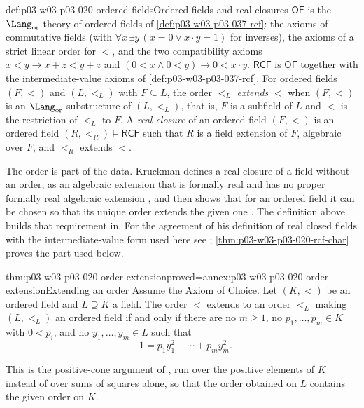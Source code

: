 \begin{hbdefinition}{def:p03-w03-p03-020-ordered-fields}{Ordered fields and real closures}
\(\mathsf{OF}\) is the \(\Lang_{\mathrm{or}}\)-theory of ordered fields of
\cref{def:p03-w03-p03-037-rcf}: the axioms of commutative fields (with
\(\forall x\,\exists y\,(x=0\lor x\mathbin{\cdot}y=1)\) for inverses), the
axioms of a strict linear order for \(<\), and the two compatibility axioms
\(x<y\rightarrow x+z<y+z\) and \((0<x\land0<y)\rightarrow0<x\mathbin{\cdot}y\).
\(\mathsf{RCF}\) is \(\mathsf{OF}\) together with the intermediate-value
axioms of \cref{def:p03-w03-p03-037-rcf}. For ordered fields \((F,<)\) and
\((L,<_L)\) with \(F\subseteq L\), the order \(<_L\) \emph{extends} \(<\)
when \((F,<)\) is an \(\Lang_{\mathrm{or}}\)-substructure of \((L,<_L)\),
that is, \(F\) is a subfield of \(L\) and \(<\) is the restriction of
\(<_L\) to \(F\). A \emph{real closure} of an ordered field \((F,<)\) is an
ordered field \((R,<_R)\models\mathsf{RCF}\) such that \(R\) is a field
extension of \(F\), algebraic over \(F\), and \(<_R\) extends \(<\).
\end{hbdefinition}

The order is part of the data. Kruckman defines a real closure of a field
without an order, as an algebraic extension that is formally real and has no
proper formally real algebraic extension \cite[Definitions~3.16 and~3.18,
p.~30]{Kruckman2020}, and then shows that for an ordered field it can be
chosen so that its unique order extends the given one
\cite[Theorem~3.28, p.~36]{Kruckman2020}. The definition above builds that
requirement in. For the agreement of his definition of real closed fields
with the intermediate-value form used here see
\cite[Theorem~3.31, p.~37]{Kruckman2020};
\cref{thm:p03-w03-p03-020-rcf-char} proves the part used below.

\begin{hblemma}{thm:p03-w03-p03-020-order-extension}{proved=annex:p03-w03-p03-020-order-extension}{Extending an order}
Assume the Axiom of Choice. Let \((K,<)\) be an ordered field and
\(L\supseteq K\) a field. The order \(<\) extends to an order \(<_L\) making
\((L,<_L)\) an ordered field if and only if there are no \(m\ge1\), no
\(p_1,\ldots,p_m\in K\) with \(0<p_i\), and no \(y_1,\ldots,y_m\in L\) such
that
\[
 -1=p_1y_1^2+\cdots+p_my_m^2 .
\]
\end{hblemma}

This is the positive-cone argument of \cite[Lemmas~3.12 and~3.13,
pp.~27--28]{Kruckman2020}, run over the positive elements of \(K\) instead
of over sums of squares alone, so that the order obtained on \(L\) contains
the given order on \(K\).

